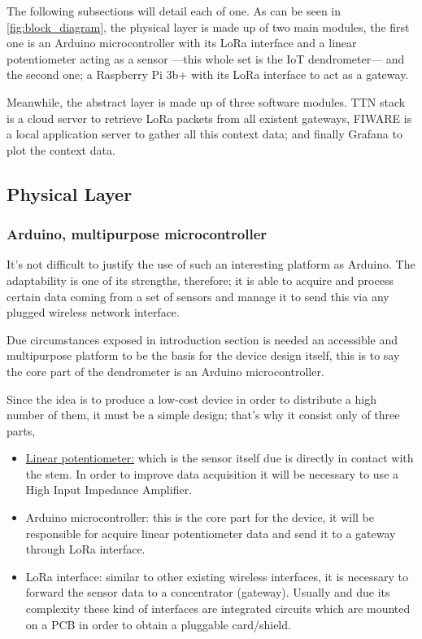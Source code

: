 \documentclass[11pt,a4paper,dvipsnames,twoside]{article}
\begin{document}
The following subsections will detail each of one. As can be seen in \ref{fig:block_diagram}, the physical layer is made up of two main modules, the first one is an Arduino microcontroller with its LoRa interface and a linear potentiometer acting as a sensor ---this whole set is the IoT dendrometer--- and the second one; a Raspberry Pi 3b+ with its LoRa interface to act as a gateway.

Meanwhile, the abstract layer is made up of three software modules. TTN stack is a cloud server to retrieve LoRa packets from all existent gateways, FIWARE is a local application server to gather all this context data; and finally Grafana to plot the context data.
\subsection{Physical Layer}

\subsubsection{Arduino, multipurpose microcontroller}
It's not difficult to justify the use of such an interesting platform as Arduino. The adaptability is one of its strengths, therefore; it is able to acquire and process certain data coming from a set of sensors and manage it to send this via any plugged wireless network interface.

Due circumstances exposed in introduction section is needed an accessible and multipurpose platform to be the basis for the device design itself, this is to say the core part of the dendrometer is an Arduino microcontroller.  

Since the idea is to produce a low-cost device in order to distribute a high number of them, it must be a simple design; that's why it consist only of three parts,

\begin{itemize}
  \item \href{https://es.rs-online.com/web/p/products/0317780/}{Linear potentiometer:} which is the sensor itself due is directly in contact with the stem. In order to improve data acquisition it will be necessary to use a High Input Impedance Amplifier.
  \item Arduino microcontroller: this is the core part for the device, it will be responsible for acquire linear potentiometer data and send it to a gateway through LoRa interface. 
  \item LoRa interface: similar to other existing wireless interfaces, it is necessary to forward the sensor data to a concentrator (gateway). Usually and due its complexity these kind of interfaces are integrated circuits which are mounted on a PCB in order to obtain a pluggable card/shield. 
\end{itemize}
\end{document}
